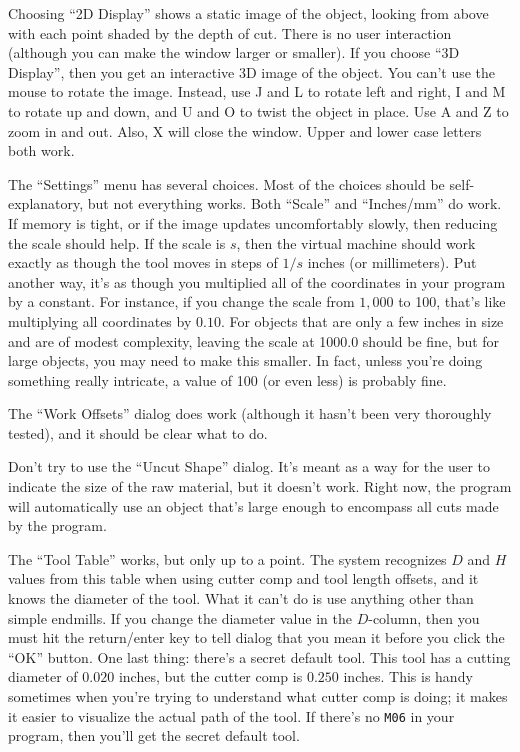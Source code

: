 \documentclass[titlepage,oneside,10pt]{article}
\begin{document}
Choosing ``2D Display'' shows a static image of the object, looking
from above with each point shaded by the depth of cut. There is no
user interaction (although you can make the window larger or
smaller). If you choose ``3D Display'', then you get an interactive
3D image of the object. You can't use the mouse to rotate the
image. Instead, use J and L to rotate left and right, I and M to
rotate up and down, and U and O to twist the object in place. Use A
and Z to zoom in and out. Also, X will close the window. Upper and
lower case letters both work.

The ``Settings'' menu has several choices. Most of the choices should
be self-explanatory, but not everything works. Both ``Scale'' and
``Inches/mm'' do work. If memory is tight, or if the
image updates uncomfortably slowly, then reducing the scale
should help. If the scale is $s$, then the virtual machine should work
exactly as though the tool moves in steps of $1/s$ inches (or
millimeters). Put another way, it's as though you multiplied all of
the coordinates in your program by a constant. For instance, if you
change the scale from $1,000$ to 100, that's like multiplying all
coordinates by $0.10$. For objects that are only a few inches in size and are
of modest complexity, leaving the scale at 1000.0 should be fine, but
for large objects, you may need to make this smaller. In fact, unless you're
doing something really intricate, a value of 100 (or even less) is
probably fine. 

The ``Work Offsets'' dialog does work (although it hasn't been very
thoroughly tested), and it should be clear what to do. 

Don't try to use the ``Uncut Shape'' dialog. It's meant as a way for
the user to indicate the size of the raw material, but it doesn't
work. Right now, the program will automatically use an object that's
large enough to encompass all cuts made by the program.

The ``Tool Table'' works, but only up to a point. The system
recognizes $D$ and $H$ values from this table when using cutter comp
and tool length offsets, and it knows the diameter of the tool. What
it can't do is use anything other than simple endmills. If you change
the diameter value in the $D$-column, then you must hit the return/enter
key to tell dialog that you mean it before you click the ``OK''
button. One last thing: there's a secret default tool. This tool has a
cutting diameter of $0.020$ inches, but the cutter comp is $0.250$
inches. This is handy sometimes when you're trying to understand what
cutter comp is doing; it makes it easier to visualize the actual path
of the tool. If there's no {\tt M06} in your program, then you'll get
the secret default tool. 
\end{document}

